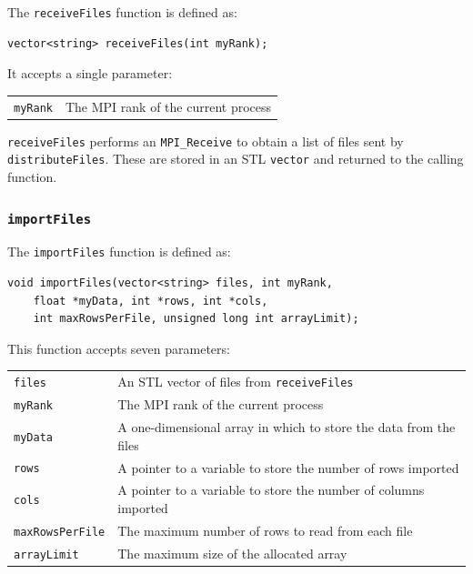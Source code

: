 \documentclass{article}
\begin{document}
The \texttt{receiveFiles} function is defined as:

\lstset{language=C++, keepspaces=true}
\begin{lstlisting}
vector<string> receiveFiles(int myRank);
\end{lstlisting}

It accepts a single parameter:

\begin{tabular}{l l}
\texttt{myRank} & The MPI rank of the current process \\
\end{tabular}

\texttt{receiveFiles} performs an \texttt{MPI\_Receive} to obtain a list of files sent by \texttt{distributeFiles}. These are stored in an STL \texttt{vector} and returned to the calling function.


%
%

\subsubsection{\texttt{importFiles}}\label{sec:importFiles}


The \texttt{importFiles} function is defined as:

\begin{minipage}{\linewidth}
\lstset{language=C++, keepspaces=true}
\begin{lstlisting}
void importFiles(vector<string> files, int myRank,
	float *myData, int *rows, int *cols, 
	int maxRowsPerFile, unsigned long int arrayLimit);
\end{lstlisting}
\end{minipage}


This function accepts seven parameters:

\begin{tabular}{l l}
\texttt{\texttt{files}}          & An STL vector of files from \texttt{receiveFiles} \\
\texttt{\texttt{myRank}}         & The MPI rank of the current process \\
\texttt{\texttt{myData}}         & A one-dimensional array in which to store the data from the files \\
\texttt{\texttt{rows}}           & A pointer to a variable to store the number of rows imported \\
\texttt{\texttt{cols}}           & A pointer to a variable to store the number of columns imported  \\
\texttt{\texttt{maxRowsPerFile}} & The maximum number of rows to read from each file \\
\texttt{\texttt{arrayLimit}}     & The maximum size of the allocated array \\
\end{tabular}
\end{document}
